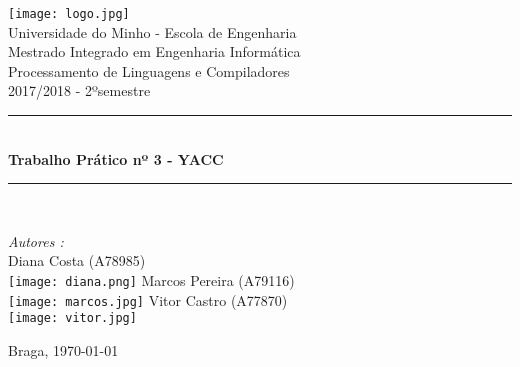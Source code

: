 \documentclass[a4paper]{article}
\begin{document}
\begin{titlepage}
\begin{center}

\texttt{[image: logo.jpg]}\\[0.5cm]

{\large Universidade do Minho - Escola de Engenharia}\\[0.5cm]

{\large Mestrado Integrado em Engenharia Informática}\\[0.5cm]

{\large Processamento de Linguagens e Compiladores}\\[0.5cm]

{\large 2017/2018 - 2ºsemestre}\\[0.5cm]
\rule{\linewidth}{0.5mm} \\[0.4cm]
{ \huge \bfseries Trabalho Prático nº 3 - YACC \\[0.4cm] }
\rule{\linewidth}{0.5mm} \\[1.5cm]

\noindent
\begin{minipage}{0.4\textwidth}
  \begin{flushleft} \large
    \emph{Autores :}\\
    Diana Costa \textsc{(A78985)}\\
    \texttt{[image: diana.png]}\break
    Marcos Pereira \textsc{(A79116)}\\
    \texttt{[image: marcos.jpg]}\break 
    Vitor Castro \textsc{(A77870)}\\
    \texttt{[image: vitor.jpg]}\break
    
  \end{flushleft}
\end{minipage}%
\vfill


{\large Braga, \today}

\end{center}
\end{titlepage}
\end{document}

